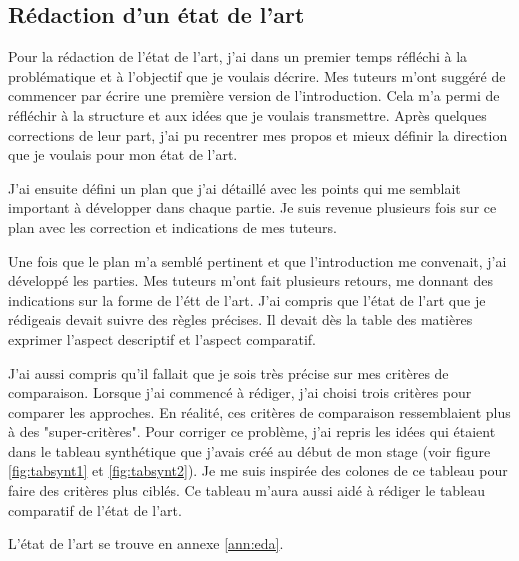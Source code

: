 \documentclass{article}
\begin{document}
	\subsection{Rédaction d'un état de l'art}
		Pour la rédaction de l'état de l'art, j'ai dans un premier temps réfléchi à la problématique et à l'objectif que je voulais décrire. Mes tuteurs m'ont suggéré de commencer par écrire une première version de l'introduction. Cela m'a permi de réfléchir à la structure et aux idées que je voulais transmettre.
		Après quelques corrections de leur part, j'ai pu recentrer mes propos et mieux définir la direction que je voulais pour mon état de l'art.\par
		J'ai ensuite défini un plan que j'ai détaillé avec les points qui me semblait important à développer dans chaque partie. Je suis revenue plusieurs fois sur ce plan avec les correction et indications de mes tuteurs.\par
		Une fois que le plan m'a semblé pertinent et que l'introduction me convenait, j'ai développé les parties. Mes tuteurs m'ont fait plusieurs retours, me donnant des indications sur la forme de l'étt de l'art. 
		J'ai compris que l'état de l'art que je rédigeais devait suivre des règles précises. 
		Il devait dès la table des matières exprimer l'aspect descriptif et l'aspect comparatif.\par
		J'ai aussi compris qu'il fallait que je sois très précise sur mes critères de comparaison. 
		Lorsque j'ai commencé à rédiger, j'ai choisi trois critères pour comparer les approches. 
		En réalité, ces critères de comparaison ressemblaient plus à des "super-critères". 
		Pour corriger ce problème, j'ai repris les idées qui étaient dans le tableau synthétique que j'avais créé au début de mon stage (voir figure \ref{fig:tabsynt1} et \ref{fig:tabsynt2}). 
		Je me suis inspirée des colones de ce tableau pour faire des critères plus ciblés. 
		Ce tableau m'aura aussi aidé à rédiger le tableau comparatif de l'état de l'art.\par
		L'état de l'art se trouve en annexe \ref{ann:eda}.
\end{document}
